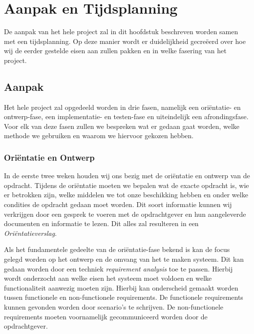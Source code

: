 \section{Aanpak en Tijdsplanning}
De aanpak van het hele project zal in dit hoofdstuk beschreven worden samen met een tijdsplanning. Op deze manier wordt er duidelijkheid gecre\"eerd over hoe wij de eerder gestelde eisen aan zullen pakken en in welke fasering van het project.

\subsection{Aanpak}
Het hele project zal opgedeeld worden in drie fasen, namelijk een ori\"entatie- en ontwerp-fase, een implementatie- en testen-fase en uiteindelijk een afrondingsfase. Voor elk van deze fasen zullen we bespreken wat er gedaan gaat worden, welke methode we gebruiken en waarom we hiervoor gekozen hebben. 

\subsubsection{Ori\"entatie en Ontwerp}
In de eerste twee weken houden wij ons bezig met de ori\"entatie en ontwerp van de opdracht. Tijdens de ori\"entatie moeten we bepalen wat de exacte opdracht is, wie er betrokken zijn, welke middelen we tot onze beschikking hebben en onder welke condities de opdracht gedaan moet worden. Dit soort informatie kunnen wij verkrijgen door een gesprek te voeren met de opdrachtgever en hun aangeleverde documenten en informatie te lezen. Dit alles zal resulteren in een \emph{Ori\"entatieverslag}.

Als het fundamentele gedeelte van de ori\"entatie-fase bekend is kan de focus gelegd worden op het ontwerp en de omvang van het te maken systeem. Dit kan gedaan worden door een techniek \emph{requirement analysis} toe te passen. Hierbij wordt onderzocht aan welke eisen het systeem moet voldoen en welke functionaliteit aanwezig moeten zijn. Hierbij kan onderscheid gemaakt worden tussen functionele en non-functionele requirements. De functionele requirements kunnen gevonden worden door scenario's te schrijven. De non-functionele requirements moeten voornamelijk gecommuniceerd worden door de opdrachtgever.

